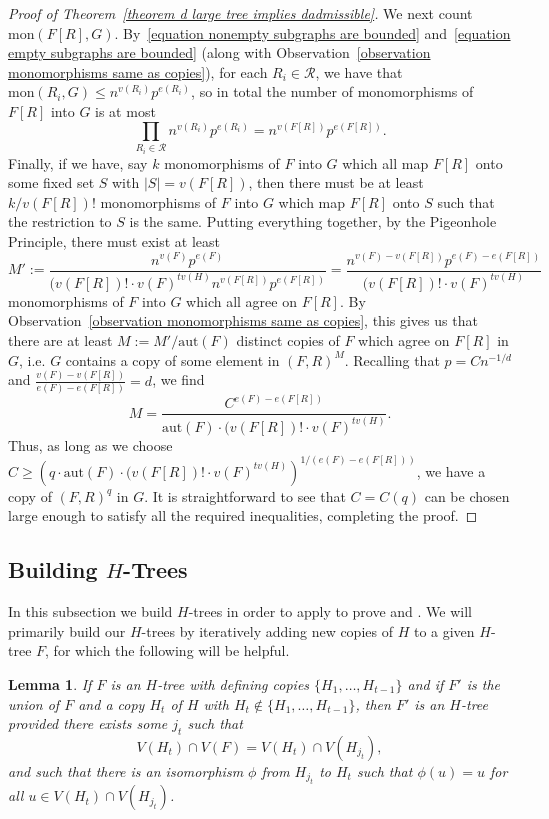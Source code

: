 \documentclass[12pt,letterpaper]{article}
\newtheorem{lemma}[theorem]{Lemma}
\theoremstyle{definition}
\newcommand{\pow}{q} %
\begin{document}
\begin{proof}[Proof of Theorem~\ref{theorem d large tree implies dadmissible}]
		We next count $\mathrm{mon}(F[R],G)$. By~\eqref{equation nonempty subgraphs are bounded} and~\eqref{equation empty subgraphs are bounded} (along with Observation~\ref{observation monomorphisms same as copies}), for each $R_i\in\mathcal{R}$, we have that $\mathrm{mon}(R_i,G)\leq n^{v(R_i)}p^{e(R_i)}$, so in total the number of monomorphisms of $F[R]$ into $G$ is at most
		\[
		\prod_{R_i\in\mathcal{R}} n^{v(R_i)}p^{e(R_i)}=n^{v(F[R])}p^{e(F[R])}.
		\]
		Finally, if we have, say $k$ monomorphisms of $F$ into $G$ which all map $F[R]$ onto some fixed set $S$ with $|S|=v(F[R])$, then there must be at least $k/v(F[R])!$ monomorphisms of $F$ into $G$ which map $F[R]$ onto $S$ such that the restriction to $S$ is the same. Putting everything together, by the Pigeonhole Principle, there must exist at least
		\[
		M':=\frac{n^{v(F)}p^{e(F)}}{(v(F[R])!\cdot v(F)^{tv(H)}n^{v(F[R])}p^{e(F[R])}}=\frac{n^{v(F)-v(F[R])}p^{e(F)-e(F[R])}}{(v(F[R])!\cdot v(F)^{tv(H)}}
		\]
		monomorphisms of $F$ into $G$ which all agree on $F[R]$. By Observation~\ref{observation monomorphisms same as copies}, this gives us that there are at least $M:=M'/\mathrm{aut}(F)$ distinct copies of $F$ which agree on $F[R]$ in $G$, i.e. $G$ contains a copy of some element in $(F,R)^M$. Recalling that $p=Cn^{-1/d}$ and $\frac{v(F)-v(F[R])}{e(F)-e(F[R])}=d$, we find
		\[
		M=\frac{C^{e(F)-e(F[R])}}{\mathrm{aut}(F)\cdot (v(F[R])!\cdot v(F)^{tv(H)}}.
		\]
		Thus, as long as we choose $C\geq \left(\pow\cdot \mathrm{aut}(F)\cdot (v(F[R])!\cdot v(F)^{tv(H)}\right)^{1/(e(F)-e(F[R]))}$, we have a copy of $(F,R)^{\pow}$ in $G$. It is straightforward to see that $C=C(\pow)$ can be chosen large enough to satisfy all the required inequalities, completing the proof.
	\end{proof}
	
	
	
	\subsection{Building \texorpdfstring{$H$}{H}-Trees}\label{subsection building H-trees}
	In this subsection we build  $H$-trees in order to apply  to prove  and .  We will primarily build our $H$-trees by iteratively adding new copies of $H$ to a given $H$-tree $F$, for which the following will be helpful.
	
	\begin{lemma}\label{lemma iteratively building H-trees}
		If $F$ is an $H$-tree with defining copies $\{H_1,\ldots,H_{t-1}\}$ and if $F'$ is the union of $F$ and a copy $H_{t}$ of $H$ with $H_t\not\in \{H_1,\dots,H_{t-1}\}$, then $F'$ is an $H$-tree provided there exists some $j_{t}$ such that 
		\[V(H_{t})\cap V(F)=V(H_{t})\cap V(H_{j_{t}}),\]
		and such that there is an isomorphism $\phi$ from $H_{j_t}$ to $H_t$ such that $\phi(u)=u$ for all $u\in V(H_{t})\cap V(H_{j_{t}})$.
	\end{lemma}
	
\end{document}
